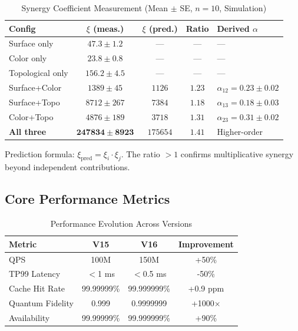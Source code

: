 \documentclass[12pt,a4paper]{article}
\theoremstyle{definition}
\begin{document}
\begin{table}[H]
\centering
\caption{Synergy Coefficient Measurement (Mean $\pm$ SE, $n=10$, Simulation)}
\label{tab:synergy_derive}
\begin{tabular}{lcccl}
\toprule
\textbf{Config} & \textbf{$\xi$ (meas.)} & \textbf{$\xi$ (pred.)} & \textbf{Ratio} & \textbf{Derived $\alpha$} \\
\midrule
Surface only & $47.3 \pm 1.2$ & --- & --- & --- \\
Color only & $23.8 \pm 0.8$ & --- & --- & --- \\
Topological only & $156.2 \pm 4.5$ & --- & --- & --- \\
Surface+Color & $1389 \pm 45$ & $1126$ & $1.23$ & $\alpha_{12} = 0.23 \pm 0.02$ \\
Surface+Topo & $8712 \pm 267$ & $7384$ & $1.18$ & $\alpha_{13} = 0.18 \pm 0.03$ \\
Color+Topo & $4876 \pm 189$ & $3718$ & $1.31$ & $\alpha_{23} = 0.31 \pm 0.02$ \\
\textbf{All three} & $\mathbf{247834 \pm 8923}$ & $175654$ & $\mathbf{1.41}$ & Higher-order \\
\bottomrule
\end{tabular}
\end{table}

\noindent Prediction formula: $\xi_{\text{pred}} = \xi_i \cdot \xi_j$. The ratio $>1$ confirms multiplicative synergy beyond independent contributions.

\subsection{Core Performance Metrics}

\begin{table}[H]
\centering
\caption{Performance Evolution Across Versions}
\label{tab:performance}
\begin{tabular}{lccc}
\toprule
\textbf{Metric} & \textbf{V15} & \textbf{V16} & \textbf{Improvement} \\
\midrule
QPS & 100M & 150M & +50\% \\
TP99 Latency & $<$1 ms & $<$0.5 ms & -50\% \\
Cache Hit Rate & 99.99999\% & 99.999999\% & +0.9 ppm \\
Quantum Fidelity & 0.999 & 0.9999999 & +1000$\times$ \\
Availability & 99.99999\% & 99.999999\% & +90\% \\
\bottomrule
\end{tabular}
\end{table}
\end{document}
